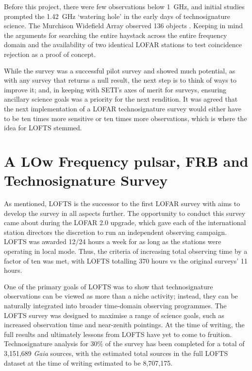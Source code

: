Before this project, there were few observations below 1~GHz, and initial studies prompted the 1.42~GHz `watering hole' in the early days of technosignature science. The Murchison Widefield Array observed 136 objects \citep{tingay:anticenter,tingay:omm,tremblay_seti_2020}. Keeping in mind the arguments for searching the entire haystack across the entire frequency domain and the availability of two identical LOFAR stations to test coincidence rejection as a proof of concept. 

While the survey was a successful pilot survey and showed much potential, as with any survey that returns a null result, the next step is to think of ways to improve it; and, in keeping with SETI's axes of merit for surveys, ensuring ancillary science goals was a priority for the next rendition. It was agreed that the next implementation of a LOFAR technosignature survey would either have to be ten times more sensitive or ten times more observations, which is where the idea for LOFTS stemmed. 

\section{A LOw Frequency pulsar, FRB and Technosignature Survey}

As mentioned, LOFTS is the successor to the first LOFAR survey with aims to develop the survey in all aspects further. The opportunity to conduct this survey came about during the LOFAR 2.0 upgrade, which gave each of the international station directors the discretion to run an independent observing campaign. LOFTS was awarded 12/24 hours a week for as long as the stations were operating in local mode. Thus, the criteria of increasing total observing time by a factor of ten was met, with LOFTS totalling 370 hours vs the original surveys' 11 hours. 

One of the primary goals of LOFTS was to show that technosignature observations can be viewed as more than a niche activity; instead, they can be naturally integrated into broader time-domain observing programmes. The LOFTS survey was designed to maximise a range of science goals, such as increased observation time and near-zenith pointings. At the time of writing, the full results and ultimately lessons from LOFTS have yet to come to fruition. Technosignature analysis for 30\% of the survey has been completed for a total of 3,151,689 \textit{Gaia} sources, with the estimated total sources in the full LOFTS dataset at the time of writing estimated to be 8,707,175. 

